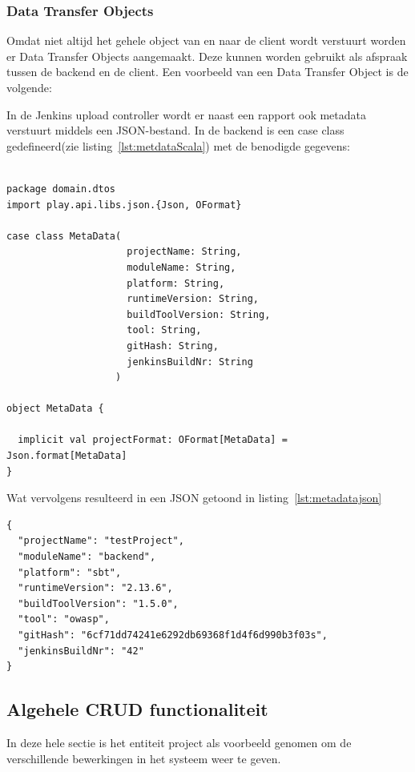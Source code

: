 
\subsubsection{Data Transfer Objects}
Omdat niet altijd het gehele object van en naar de client wordt verstuurt worden er Data Transfer Objects aangemaakt. Deze kunnen worden gebruikt als afspraak tussen de backend en de client. Een voorbeeld van een Data Transfer Object is de volgende:

In de Jenkins upload controller wordt er naast een rapport ook metadata verstuurt middels een JSON-bestand. In de backend is een case class gedefineerd(zie listing~\ref{lst:metdataScala}) met de benodigde gegevens:
\begin{lstlisting}[caption={case class MetaData in MetaData.scala},label=lst:metdataScala, captionpos=b]

package domain.dtos
import play.api.libs.json.{Json, OFormat}

case class MetaData(
                     projectName: String,
                     moduleName: String,
                     platform: String,
                     runtimeVersion: String,
                     buildToolVersion: String,
                     tool: String,
                     gitHash: String,
                     jenkinsBuildNr: String
                   )

object MetaData {

  implicit val projectFormat: OFormat[MetaData] = Json.format[MetaData]
}

\end{lstlisting}
\newpage
Wat vervolgens resulteerd in een JSON getoond in listing~\ref{lst:metadatajson}
\begin{lstlisting}[caption={MetaData.json},label=lst:metadatajson, captionpos=b]
{
  "projectName": "testProject",
  "moduleName": "backend",
  "platform": "sbt",
  "runtimeVersion": "2.13.6",
  "buildToolVersion": "1.5.0",
  "tool": "owasp",
  "gitHash": "6cf71dd74241e6292db69368f1d4f6d990b3f03s",
  "jenkinsBuildNr": "42"
}
\end{lstlisting}
\subsection{Algehele CRUD functionaliteit}\label{subsec:algehele-crud-functionaliteit}
In deze hele sectie is het entiteit project als voorbeeld genomen om de verschillende bewerkingen in het systeem weer te geven.
